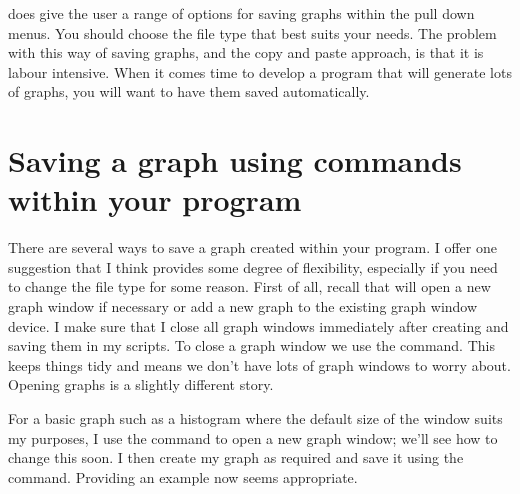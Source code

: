 \R{} does give the user a range of options for saving graphs within the pull down menus. You should choose the file type that best suits your needs. The problem with this way of saving graphs, and the copy and paste approach, is that it is labour intensive. When it comes time to develop a program that will generate lots of graphs, you will want to have them saved automatically. 
 
\section{Saving a graph using commands within your \R{} program} 
 
There are several ways to save a graph created within your \R{} program. I offer one suggestion that I think provides some degree of flexibility, especially if you need to change the file type for some reason. First of all, recall that \R{} will open a new graph window if necessary or add a new graph to the existing graph window device. I make sure that I close all graph windows immediately after creating and saving them in my \R{} scripts. To close a graph window we use the  command. This keeps things tidy and means we don't have lots of graph windows to worry about. Opening graphs is a slightly different story. 
 
For a basic graph such as a histogram where the default size of the window suits my purposes, I use the  command to open a new graph window; we'll see how to change this soon. I then create my graph as required and save it using the  command. Providing an example now seems appropriate.  
 
